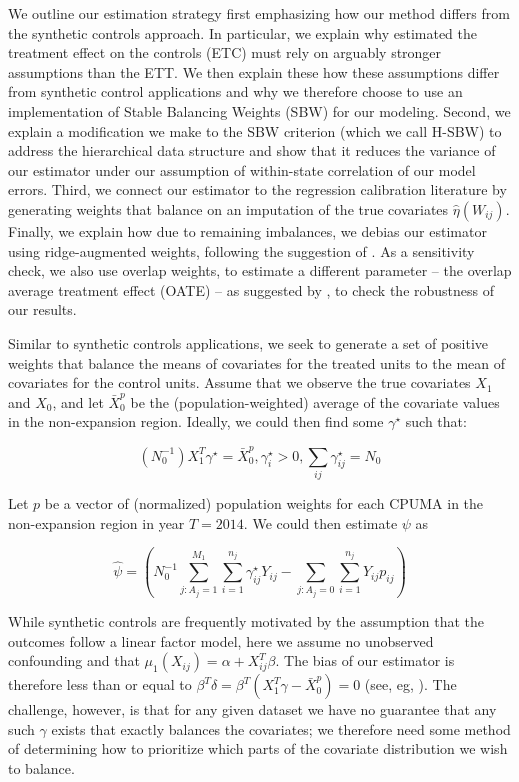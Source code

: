 \documentclass[12pt]{article}
\begin{document}
We outline our estimation strategy first emphasizing how our method differs from the synthetic controls approach. In particular, we explain why estimated the treatment effect on the controls (ETC) must rely on arguably stronger assumptions than the ETT. We then explain these how these assumptions differ from synthetic control applications and why we therefore choose to use an implementation of Stable Balancing Weights (SBW) for our modeling. Second, we explain a modification we make to the SBW criterion (which we call H-SBW) to address the hierarchical data structure and show that it reduces the variance of our estimator under our assumption of within-state correlation of our model errors. Third, we connect our estimator to the regression calibration literature by generating weights that balance on an imputation of the true covariates $\hat{\eta}(W_{ij})$. Finally, we explain how due to remaining imbalances, we debias our estimator using ridge-augmented weights, following the suggestion of \cite{ben2018augmented}. As a sensitivity check, we also use overlap weights, to estimate a different parameter -- the overlap average treatment effect (OATE) -- as suggested by \cite{li2018balancing}, to check the robustness of our results.

Similar to synthetic controls applications, we seek to generate a set of positive weights that balance the means of covariates for the treated units to the mean of covariates for the control units. Assume that we observe the true covariates $X_1$ and $X_0$, and let $\bar{X}_0^p$ be the (population-weighted) average of the covariate values in the non-expansion region. Ideally, we could then find some $\gamma^\star$ such that: 

$$
(N_0^{-1})X_1^T\gamma^\star = \bar{X}_0^p, \gamma_i^\star > 0, \sum_{ij} \gamma_{ij}^\star = N_0
$$

Let $p$ be a vector of (normalized) population weights for each CPUMA in the non-expansion region in year $T = 2014$. We could then estimate $\psi$ as

$$
\hat{\psi} = (N_0^{-1}\sum_{j: A_j = 1}^{M_1}\sum_{i = 1}^{n_j}\gamma_{ij}^\star Y_{ij} - \sum_{j: A_j = 0}\sum_{i = 1}^{n_j}Y_{ij}p_{ij})
$$

While synthetic controls are frequently motivated by the assumption that the outcomes follow a linear factor model, here we assume no unobserved confounding and that $\mu_1(X_{ij}) = \alpha + X_{ij}^T\beta$. The bias of our estimator is therefore less than or equal to $\beta^T \delta = \beta^T(X_1^T\gamma - \bar{X}_0^p) = 0$ (see, eg, \cite{zubizarreta2015stable}). The challenge, however, is that for any given dataset we have no guarantee that any such $\gamma$ exists that exactly balances the covariates; we therefore need some method of determining how to prioritize which parts of the covariate distribution we wish to balance.
\end{document}
